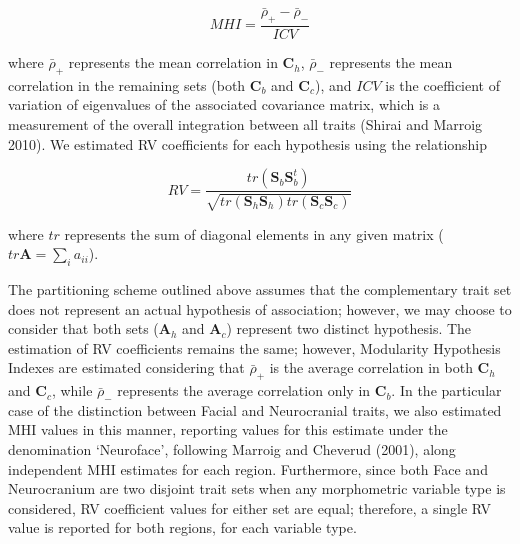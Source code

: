 \documentclass[12pt,]{article}
\begin{document}
\begin{equation}
MHI = \frac {\bar{\rho}_{+} - \bar{\rho}_{-}} {ICV}
\label{eq:mi}
\end{equation}

where $\bar{\rho}_{+}$ represents the mean correlation in
$\mathbf{C}_h$, $\bar{\rho}_{-}$ represents the mean correlation in the
remaining sets (both $\mathbf{C}_b$ and $\mathbf{C}_c$), and $ICV$ is
the coefficient of variation of eigenvalues of the associated covariance
matrix, which is a measurement of the overall integration between all
traits (Shirai and Marroig 2010). We estimated RV coefficients for each
hypothesis using the relationship

\begin{equation}
RV = \frac{tr(\mathbf{S}_{b}\mathbf{S}^t_{b})}{\sqrt{tr(\mathbf{S}_h \mathbf{S}_h)tr(\mathbf{S}_c \mathbf{S}_c)}}
\label{eq:rv}
\end{equation}

where $tr$ represents the sum of diagonal elements in any given matrix
($tr \mathbf{A} = \sum_i a_{ii}$).

The partitioning scheme outlined above assumes that the complementary
trait set does not represent an actual hypothesis of association;
however, we may choose to consider that both sets ($\mathbf{A}_h$ and
$\mathbf{A}_c$) represent two distinct hypothesis. The estimation of RV
coefficients remains the same; however, Modularity Hypothesis Indexes
are estimated considering that $\bar{\rho}_{+}$ is the average
correlation in both $\mathbf{C}_h$ and $\mathbf{C}_c$, while
$\bar{\rho}_{-}$ represents the average correlation only in
$\mathbf{C}_b$. In the particular case of the distinction between Facial
and Neurocranial traits, we also estimated MHI values in this manner,
reporting values for this estimate under the denomination `Neuroface',
following Marroig and Cheverud (2001), along independent MHI estimates
for each region. Furthermore, since both Face and Neurocranium are two
disjoint trait sets when any morphometric variable type is considered,
RV coefficient values for either set are equal; therefore, a single RV
value is reported for both regions, for each variable type.
\end{document}
